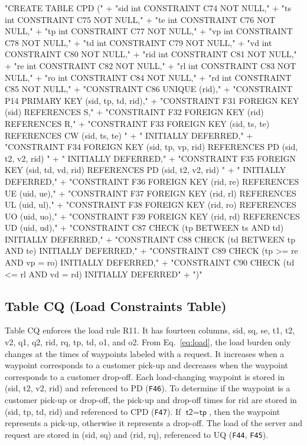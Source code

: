 "CREATE TABLE CPD ("
  + "sid int  CONSTRAINT C74 NOT NULL,"
  + "ts  int  CONSTRAINT C75 NOT NULL,"
  + "te  int  CONSTRAINT C76 NOT NULL,"
  + "tp  int  CONSTRAINT C77 NOT NULL,"
  + "vp  int  CONSTRAINT C78 NOT NULL,"
  + "td  int  CONSTRAINT C79 NOT NULL,"
  + "vd  int  CONSTRAINT C80 NOT NULL,"
  + "rid int  CONSTRAINT C81 NOT NULL,"
  + "re  int  CONSTRAINT C82 NOT NULL,"
  + "rl  int  CONSTRAINT C83 NOT NULL,"
  + "ro  int  CONSTRAINT C84 NOT NULL,"
  + "rd  int  CONSTRAINT C85 NOT NULL,"
  + "CONSTRAINT C86 UNIQUE (rid),"
  + "CONSTRAINT P14 PRIMARY KEY (sid, tp, td, rid),"
  + "CONSTRAINT F31 FOREIGN KEY (sid) REFERENCES S,"
  + "CONSTRAINT F32 FOREIGN KEY (rid) REFERENCES R,"
  + "CONSTRAINT F33 FOREIGN KEY (sid, ts, te) REFERENCES CW (sid, ts, te) "
  + "  INITIALLY DEFERRED,"
  + "CONSTRAINT F34 FOREIGN KEY (sid, tp, vp, rid) REFERENCES PD (sid, t2, v2, rid) "
  + "  INITIALLY DEFERRED,"
  + "CONSTRAINT F35 FOREIGN KEY (sid, td, vd, rid) REFERENCES PD (sid, t2, v2, rid) "
  + "  INITIALLY DEFERRED,"
  + "CONSTRAINT F36 FOREIGN KEY (rid, re) REFERENCES UE (uid, ue),"
  + "CONSTRAINT F37 FOREIGN KEY (rid, rl) REFERENCES UL (uid, ul),"
  + "CONSTRAINT F38 FOREIGN KEY (rid, ro) REFERENCES UO (uid, uo),"
  + "CONSTRAINT F39 FOREIGN KEY (rid, rd) REFERENCES UD (uid, ud),"
  + "CONSTRAINT C87 CHECK (tp BETWEEN ts AND td) INITIALLY DEFERRED,"
  + "CONSTRAINT C88 CHECK (td BETWEEN tp AND te) INITIALLY DEFERRED,"
  + "CONSTRAINT C89 CHECK (tp >= re AND vp = ro) INITIALLY DEFERRED,"
  + "CONSTRAINT C90 CHECK (td <= rl AND vd = rd) INITIALLY DEFERRED"
  + ")"
\nwendcode{}\nwdocspar

\subsection{Table CQ (Load Constraints Table)}
Table CQ enforces the load rule R11. It has fourteen columns, \textsf{sid},
\textsf{sq}, \textsf{se}, \textsf{t1}, \textsf{t2}, \textsf{v2}, \textsf{q1},
\textsf{q2}, \textsf{rid}, \textsf{rq}, \textsf{tp}, \textsf{td}, \textsf{o1},
and \textsf{o2}.  From Eq.~\ref{eq:load}, the load burden only changes at the
times of waypoints labeled with a request. It increases when a waypoint
corresponds to a customer pick-up and decreases when the waypoint corresponds
to a customer drop-off. Each load-changing waypoint is stored in (\textsf{sid},
\textsf{t2}, \textsf{v2}, \textsf{rid}) and referenced to PD ({\tt{}F46}).  To
determine if the waypoint is a customer pick-up or drop-off, the pick-up and
drop-off times for \textsf{rid} are stored in (\textsf{sid}, \textsf{tp},
\textsf{td}, \textsf{rid}) and referenced to CPD ({\tt{}F47}).  If
$\textsf{t2}=\textsf{tp}$, then the waypoint represents a pick-up, otherwise it
represents a drop-off. The load of the server and request are stored in
(\textsf{sid}, \textsf{sq}) and (\textsf{rid}, \textsf{rq}), referenced to UQ
({\tt{}F44}, {\tt{}F45}).

